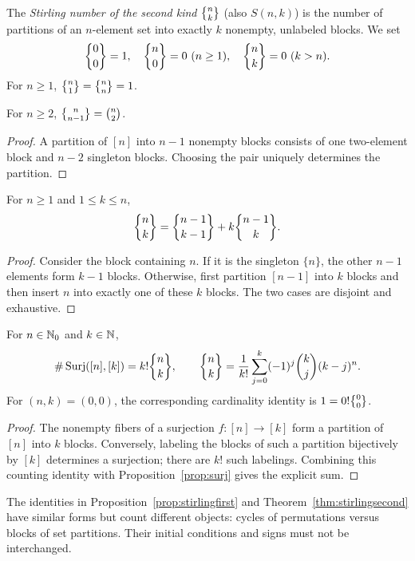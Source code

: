 \documentclass[11pt, oneside]{article}
\begin{document}
\begin{definition}
The \emph{Stirling number of the second kind} $\stirtwo{n}{k}$ (also $S(n, k)$) is the number of partitions of an $n$-element set into exactly $k$ nonempty, unlabeled blocks. We set
\[
\stirtwo{0}{0}=1, \quad \stirtwo{n}{0}=0\ (n\ge1), \quad \stirtwo{n}{k}=0\ (k>n).
\]
For $n\ge1$, $\stirtwo{n}{1}=\stirtwo{n}{n}=1$.
\end{definition}
\begin{proposition}
For $n\ge2$, $\stirtwo{n}{n-1}=\binom n2$.
\end{proposition}
\begin{proof}
A partition of $[n]$ into $n-1$ nonempty blocks consists of one two-element block and $n-2$ singleton blocks. Choosing the pair uniquely determines the partition.
\end{proof}
\begin{theorem}\label{thm:stirlingsecond}
For $n\ge1$ and $1\le k\le n$,
\[
\stirtwo{n}{k}=\stirtwo{n-1}{k-1}+k\stirtwo{n-1}{k}.
\]
\end{theorem}
\begin{proof}
Consider the block containing $n$. If it is the singleton $\{n\}$, the other $n-1$ elements form $k-1$ blocks. Otherwise, first partition $[n-1]$ into $k$ blocks and then insert $n$ into exactly one of these $k$ blocks. The two cases are disjoint and exhaustive.
\end{proof}
\begin{theorem}\label{thm:surjstirling}
For $n\in\mathbb{N}_0$ and $k\in\mathbb{N}$,
\[
\#\Surj([n], [k])=k!\stirtwo{n}{k}, \qquad
\stirtwo{n}{k}=\frac1{k!}\sum_{j=0}^{k}(-1)^j\binom kj(k-j)^n.
\]
For $(n, k)=(0, 0)$, the corresponding cardinality identity is $1=0!\stirtwo{0}{0}$.
\end{theorem}
\begin{proof}
The nonempty fibers of a surjection $f:[n]\to[k]$ form a partition of $[n]$ into $k$ blocks. Conversely, labeling the blocks of such a partition bijectively by $[k]$ determines a surjection; there are $k!$ such labelings. Combining this counting identity with Proposition~\ref{prop:surj} gives the explicit sum.
\end{proof}
\begin{remark}
The identities in Proposition~\ref{prop:stirlingfirst} and Theorem~\ref{thm:stirlingsecond} have similar forms but count different objects: cycles of permutations versus blocks of set partitions. Their initial conditions and signs must not be interchanged.
\end{remark}
\end{document}
